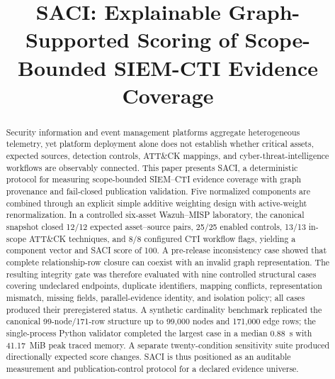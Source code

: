 \documentclass[a4paper,conference]{IEEEtran}
\begin{document}
\title{SACI: Explainable Graph-Supported Scoring of Scope-Bounded SIEM-CTI Evidence Coverage}

\author{
}

\maketitle
\thispagestyle{firstpage}

\begin{abstract}
Security information and event management platforms aggregate heterogeneous telemetry, yet platform deployment alone does not establish whether critical assets, expected sources, detection controls, ATT\&CK mappings, and cyber-threat-intelligence workflows are observably connected. This paper presents SACI, a deterministic protocol for measuring scope-bounded SIEM--CTI evidence coverage with graph provenance and fail-closed publication validation. Five normalized components are combined through an explicit simple additive weighting design with active-weight renormalization. In a controlled six-asset Wazuh--MISP laboratory, the canonical snapshot closed 12/12 expected asset--source pairs, 25/25 enabled controls, 13/13 in-scope ATT\&CK techniques, and 8/8 configured CTI workflow flags, yielding a component vector and SACI score of 100. A pre-release inconsistency case showed that complete relationship-row closure can coexist with an invalid graph representation. The resulting integrity gate was therefore evaluated with nine controlled structural cases covering undeclared endpoints, duplicate identifiers, mapping conflicts, representation mismatch, missing fields, parallel-evidence identity, and isolation policy; all cases produced their preregistered status. A synthetic cardinality benchmark replicated the canonical 99-node/171-row structure up to 99,000 nodes and 171,000 edge rows; the single-process Python validator completed the largest case in a median 0.88~s with 41.17~MiB peak traced memory. A separate twenty-condition sensitivity suite produced directionally expected score changes. SACI is thus positioned as an auditable measurement and publication-control protocol for a declared evidence universe.
\end{abstract}
\end{document}
